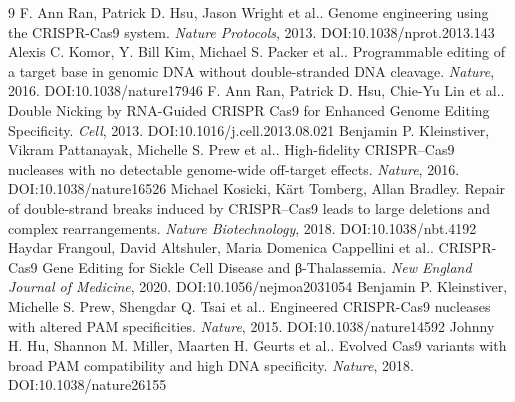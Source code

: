 \documentclass[11pt]{article}
\begin{document}
\begin{thebibliography}{9}
 F. Ann Ran, Patrick D. Hsu, Jason Wright et al.. Genome engineering using the CRISPR-Cas9 system. \emph{Nature Protocols}, 2013. DOI:10.1038/nprot.2013.143
 Alexis C. Komor, Y. Bill Kim, Michael S. Packer et al.. Programmable editing of a target base in genomic DNA without double-stranded DNA cleavage. \emph{Nature}, 2016. DOI:10.1038/nature17946
 F. Ann Ran, Patrick D. Hsu, Chie-Yu Lin et al.. Double Nicking by RNA-Guided CRISPR Cas9 for Enhanced Genome Editing Specificity. \emph{Cell}, 2013. DOI:10.1016/j.cell.2013.08.021
 Benjamin P. Kleinstiver, Vikram Pattanayak, Michelle S. Prew et al.. High-fidelity CRISPR–Cas9 nucleases with no detectable genome-wide off-target effects. \emph{Nature}, 2016. DOI:10.1038/nature16526
 Michael Kosicki, Kärt Tomberg, Allan Bradley. Repair of double-strand breaks induced by CRISPR–Cas9 leads to large deletions and complex rearrangements. \emph{Nature Biotechnology}, 2018. DOI:10.1038/nbt.4192
 Haydar Frangoul, David Altshuler, Maria Domenica Cappellini et al.. CRISPR-Cas9 Gene Editing for Sickle Cell Disease and β-Thalassemia. \emph{New England Journal of Medicine}, 2020. DOI:10.1056/nejmoa2031054
 Benjamin P. Kleinstiver, Michelle S. Prew, Shengdar Q. Tsai et al.. Engineered CRISPR-Cas9 nucleases with altered PAM specificities. \emph{Nature}, 2015. DOI:10.1038/nature14592
 Johnny H. Hu, Shannon M. Miller, Maarten H. Geurts et al.. Evolved Cas9 variants with broad PAM compatibility and high DNA specificity. \emph{Nature}, 2018. DOI:10.1038/nature26155
\end{thebibliography}
\end{document}
